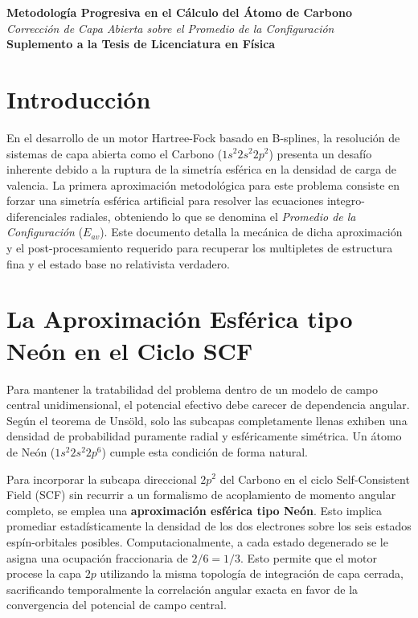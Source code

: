\documentclass[11pt, a4paper]{article}
\begin{document}
\begin{center}
    {\LARGE \textbf{Metodología Progresiva en el Cálculo del Átomo de Carbono}} \\
    \vspace{0.5cm}
    {\large \textit{Corrección de Capa Abierta sobre el Promedio de la Configuración}} \\
    \vspace{0.3cm}
    \textbf{Suplemento a la Tesis de Licenciatura en Física}
\end{center}

\section{Introducción}
En el desarrollo de un motor Hartree-Fock basado en B-splines, la resolución de sistemas de capa abierta como el Carbono ($1s^2 2s^2 2p^2$) presenta un desafío inherente debido a la ruptura de la simetría esférica en la densidad de carga de valencia. La primera aproximación metodológica para este problema consiste en forzar una simetría esférica artificial para resolver las ecuaciones integro-diferenciales radiales, obteniendo lo que se denomina el \textit{Promedio de la Configuración} ($E_{av}$). Este documento detalla la mecánica de dicha aproximación y el post-procesamiento requerido para recuperar los multipletes de estructura fina y el estado base no relativista verdadero.

\section{La Aproximación Esférica tipo Neón en el Ciclo SCF}
Para mantener la tratabilidad del problema dentro de un modelo de campo central unidimensional, el potencial efectivo debe carecer de dependencia angular. Según el teorema de Unsöld, solo las subcapas completamente llenas exhiben una densidad de probabilidad puramente radial y esféricamente simétrica. Un átomo de Neón ($1s^2 2s^2 2p^6$) cumple esta condición de forma natural.

Para incorporar la subcapa direccional $2p^2$ del Carbono en el ciclo Self-Consistent Field (SCF) sin recurrir a un formalismo de acoplamiento de momento angular completo, se emplea una \textbf{aproximación esférica tipo Neón}. Esto implica promediar estadísticamente la densidad de los dos electrones sobre los seis estados espín-orbitales posibles. Computacionalmente, a cada estado degenerado se le asigna una ocupación fraccionaria de $2/6 = 1/3$. Esto permite que el motor procese la capa $2p$ utilizando la misma topología de integración de capa cerrada, sacrificando temporalmente la correlación angular exacta en favor de la convergencia del potencial de campo central.
\end{document}
